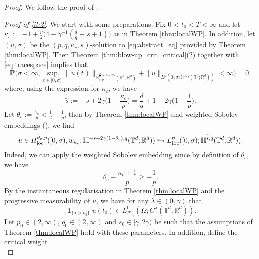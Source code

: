 \documentclass[11pt, a4paper,oneside, reqno]{amsart}
\theoremstyle{remark} %
\theoremstyle{definition} %
\numberwithin{theorem}{section}
\numberwithin{equation}{section}
\newcommand{\T}{\mathbb{T}}
\newcommand{\Hs}{\mathbb{H}}
\newcommand{\RR}{\mathbb{R}}
\newcommand{\BB}{\mathbb{B}}
\newcommand{\half}{\frac{1}{2}}
\newcommand{\gam}{\gamma}
\newcommand{\loc}{{\rm loc}}
\renewcommand{\tilde}[1]{\widetilde{#1}}
\DeclareMathOperator{\ind}{\mathbf{1}}
\begin{document}
\begin{proof}
    We follow the proof of \cite[Theorem 2.10]{AV23}.

    \textit{Proof of \ref{it:2}}. We start with some preparations. Fix $0<t_0<T<\infty$ and let $\kappa_c:=-1 + \frac{p}{2}\big(4-\gam^{-1}(\frac{d}{q}+s+1)\big)$ as in Theorem \ref{thm:localWP}. In addition, let $(u, \sigma)$ be the $(p,q, \kappa_c,s)$-solution to \eqref{eq:abstract_eq} provided by Theorem \ref{thm:localWP}. Then Theorem \ref{thm:blow-up_crit_critical}(2) together with \eqref{eq:tracespace} implies that
    \begin{equation}\label{eq:para_indep1}
        \mathbf{P}\big(\sigma<\infty,\sup\limits_{t \in [0, \sigma)} \|u(t)\|_{\BB^{\frac{d}{q}+1-2\gam}_{q,p}(\T^d; \RR^d)} +  \|u\|_{L^p(0, \sigma; \Hs^{\tilde{s},q}(\T^d; \RR^d))} < \infty\big)=0,
    \end{equation}
    where, using the expression for $\kappa_c$, we have
    \begin{equation*}
       \tilde{s}:= -s+2\gam \big(1-\frac{\kappa_c}{p}\big)= \frac{d}{q}+1 -2\gam\big(1-\frac{1}{p}\big).
    \end{equation*}
    Let $\theta_c:= \frac{\kappa_c}{p} < \half - \frac{1}{p}$, then by Theorem \ref{thm:localWP} and weighted Sobolev embeddings (\cite[Proposition 2.7]{AV22}), we find
    \begin{equation}\label{eq:u_instan}
        u\in H^{\theta_c, p}_{\loc}([0,\sigma), w_{\kappa_c}; \Hs^{-s+2\gam(1-\theta_c),q}(\T^d; \RR^d))\hookrightarrow L^p_{\loc}([0,\sigma); \Hs^{ \tilde{s}, q}(\T^d; \RR^d)).
    \end{equation}
    Indeed, we can apply the weighted Sobolev embedding since by definition of $\theta_c$, we have
    \begin{equation*}
        \theta_c-\frac{\kappa_c+1}{p}\geq -\frac{1}{p}. 
    \end{equation*}
By the instantaneous regularisation in Theorem \ref{thm:localWP} and the progressive measurability of $u$, we have for any $\lambda\in (0,\gam)$ that
\begin{equation}\label{eq:para_indep2}
    \ind_{\{\sigma>t_0\}}u(t_0)\in L^0_{\mathcal{F}_{t_0}}(\Omega; C^{\lambda }(\T^d; \RR^d)).
\end{equation}
Let $p_0\in (2,\infty)$, $q_0\in (2,\infty)$ and $s_0\in [\gam, 2\gam)$ be such that the assumptions of Theorem \ref{thm:localWP} hold with these parameters. In addition, define the critical weight
\begin{equation}\label{eq:kappa0}

\end{equation}
\end{proof}
\end{document}
